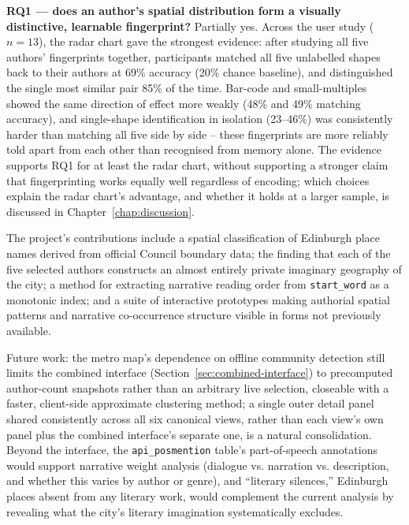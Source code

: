 \documentclass[logo,msc]{infthesis}
\begin{document}
\textbf{RQ1 --- does an author's spatial distribution form a visually distinctive, learnable fingerprint?} Partially yes. Across the user study ($n=13$), the radar chart gave the strongest evidence: after studying all five authors' fingerprints together, participants matched all five unlabelled shapes back to their authors at 69\% accuracy (20\% chance baseline), and distinguished the single most similar pair 85\% of the time. Bar-code and small-multiples showed the same direction of effect more weakly (48\% and 49\% matching accuracy), and single-shape identification in isolation (23--46\%) was consistently harder than matching all five side by side -- these fingerprints are more reliably told apart from each other than recognised from memory alone. The evidence supports RQ1 for at least the radar chart, without supporting a stronger claim that fingerprinting works equally well regardless of encoding; which choices explain the radar chart's advantage, and whether it holds at a larger sample, is discussed in Chapter~\ref{chap:discussion}.

The project's contributions include a spatial classification of Edinburgh place names derived from official Council boundary data; the finding that each of the five selected authors constructs an almost entirely private imaginary geography of the city; a method for extracting narrative reading order from \texttt{start\_word} as a monotonic index; and a suite of interactive prototypes making authorial spatial patterns and narrative co-occurrence structure visible in forms not previously available.

Future work: the metro map's dependence on offline community detection still limits the combined interface (Section~\ref{sec:combined-interface}) to precomputed author-count snapshots rather than an arbitrary live selection, closeable with a faster, client-side approximate clustering method; a single outer detail panel shared consistently across all six canonical views, rather than each view's own panel plus the combined interface's separate one, is a natural consolidation. Beyond the interface, the \texttt{api\_posmention} table's part-of-speech annotations would support narrative weight analysis (dialogue vs. narration vs. description, and whether this varies by author or genre), and ``literary silences,'' Edinburgh places absent from any literary work, would complement the current analysis by revealing what the city's literary imagination systematically excludes.
 
 


 
\end{document}
